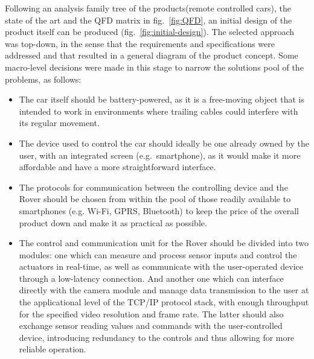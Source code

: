 %
Following an analysis family tree of the products(remote controlled cars), the state of the art and the QFD matrix in fig.~\ref{fig:QFD}, an initial design of the product itself can be produced (fig.~\ref{fig:initial-design}).
The selected approach was top-down, in the sense that the requirements and specifications were addressed and that resulted in a general diagram of the product concept. Some macro-level decisions were made in this stage to narrow the solutions pool of the problems, as follows:
\begin{itemize}
\item  The car itself should be battery-powered, as it is a free-moving object that is intended to work in environments where trailing cables could interfere with its regular movement.
\item The device used to control the car should ideally be one already owned by the user, with an integrated screen (e.g.~smartphone), as it would make it more affordable and have a more straightforward interface.
\item The protocols for communication between the controlling device and the Rover should be chosen from within the pool of those readily available to smartphones (e.g. Wi-Fi, GPRS, Bluetooth) to keep the price of the overall product down and make it as practical as possible.
\item  The control and communication unit for the Rover should be divided into two modules: one which can measure and process sensor inputs and control the actuators in real-time, as well as communicate with the user-operated device through a low-latency connection. And another one which can interface directly with the camera module and manage data transmission to the user at the applicational level of the TCP/IP protocol stack, with enough throughput for the specified video resolution and frame rate. The latter should also exchange sensor reading values and commands with the user-controlled device, introducing redundancy to the controls and thus allowing for more reliable operation.
\end{itemize}

